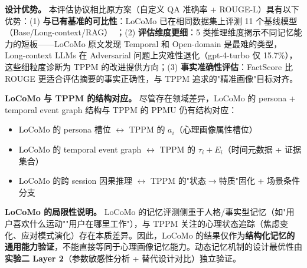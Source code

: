 \documentclass[12pt,a4paper]{article}
\begin{document}
\textbf{设计优势。}
本评估协议相比原方案（自定义 QA 准确率 + ROUGE-L）具有以下优势：(1) \textbf{与已有基准的可比性}：LoCoMo 已在相同数据集上评测 11 个基线模型（Base/Long-context/RAG）~\cite{maharana2024locomo}；(2) \textbf{评估维度更细}：5 类推理维度揭示不同记忆能力的短板——LoCoMo 原文发现 Temporal 和 Open-domain 是最难的类型，Long-context LLMs 在 Adversarial 问题上灾难性退化（gpt-4-turbo 仅 15.7\%），这些细粒度诊断为 TPPM 的改进提供方向；(3) \textbf{事实准确性评估}：FactScore 比 ROUGE 更适合评估摘要的事实正确性，与 TPPM 追求的"精准画像"目标对齐。

\textbf{LoCoMo 与 TPPM 的结构对应。} 尽管存在领域差异，LoCoMo 的 persona + temporal event graph 结构与 TPPM 的 PPMU 仍有结构对应：
\begin{itemize}
  \item LoCoMo 的 persona 槽位 $\leftrightarrow$ TPPM 的 $a_i$（心理画像属性槽位）
  \item LoCoMo 的 temporal event graph $\leftrightarrow$ TPPM 的 $\tau_i + E_i$（时间元数据 + 证据集合）
  \item LoCoMo 的跨 session 因果推理 $\leftrightarrow$ TPPM 的"状态$\to$特质"固化 + 场景条件分支
\end{itemize}

\textbf{LoCoMo 的局限性说明。} LoCoMo 的记忆评测侧重于人格/事实型记忆（如"用户喜欢什么运动""用户在哪里工作"），与 TPPM 关注的心理状态追踪（焦虑变化、应对模式演化）存在本质差异。因此，LoCoMo 的结果仅作为\textbf{结构化记忆的通用能力验证}，不能直接等同于心理画像记忆能力。动态记忆机制的设计最优性由\textbf{实验二 Layer 2}（参数敏感性分析 + 替代设计对比）独立验证。
\end{document}
